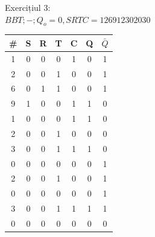 \documentclass[12pt]{article}
\begin{document}
\begin{figure}[h!]
    \begin{minipage}{0.3\textwidth}
        Exercițiul 3:\\ $BBT;-;Q_{o}=0,SRTC=126912302030$
    \end{minipage}
    \hfill
    \begin{minipage}{0.5\textwidth}
        \begin{tabular}{|c|c|c|c|c|c|c|}
            \hline
            \# & S & R & T & C & Q & $\bar{Q}$ \\ \hline
            1  & 0 & 0 & 0 & 1 & 0 & 1 \\ \hline
            2  & 0 & 0 & 1 & 0 & 0 & 1 \\ \hline
            6  & 0 & 1 & 1 & 0 & 0 & 1 \\ \hline
            9  & 1 & 0 & 0 & 1 & 1 & 0 \\ \hline
            1  & 0 & 0 & 0 & 1 & 1 & 0 \\ \hline
            2  & 0 & 0 & 1 & 0 & 0 & 0 \\ \hline
            3  & 0 & 0 & 1 & 1 & 1 & 0 \\ \hline
            0  & 0 & 0 & 0 & 0 & 0 & 1 \\ \hline
            2  & 0 & 0 & 1 & 0 & 0 & 1 \\ \hline
            0  & 0 & 0 & 0 & 0 & 0 & 1 \\ \hline
            3  & 0 & 0 & 1 & 1 & 1 & 1 \\ \hline
            0  & 0 & 0 & 0 & 0 & 0 & 0 \\ \hline
        \end{tabular}
    \end{minipage}
\end{figure}
\end{document}
